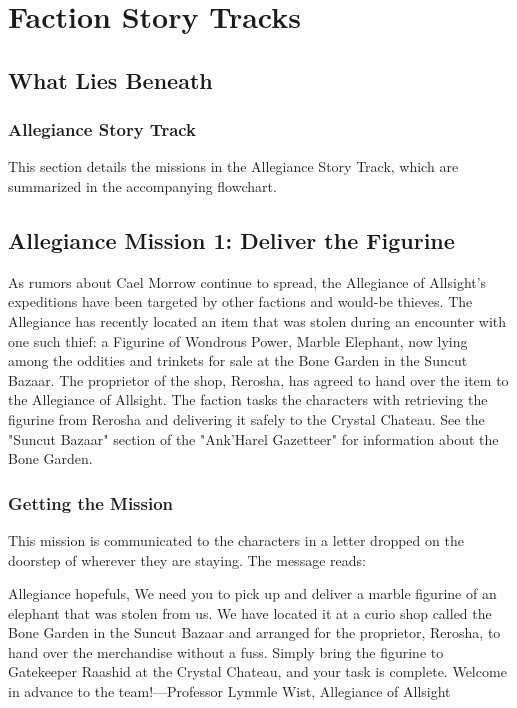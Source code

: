 \documentclass[10pt,a4,twoside,twocolumn,openany,nodeprecatedcode]{dndbook}
\begin{document}
\section{Faction Story Tracks}
\subsection{What Lies Beneath}
\subsubsection{Allegiance Story Track}
This section details the missions in the Allegiance Story Track, which are summarized in the accompanying flowchart.
\subsection{Allegiance Mission 1: Deliver the Figurine}
As rumors about Cael Morrow continue to spread, the Allegiance of Allsight's expeditions have been targeted by other factions and would-be thieves. The Allegiance has recently located an item that was stolen during an encounter with one such thief: a Figurine of Wondrous Power, Marble Elephant, now lying among the oddities and trinkets for sale at the Bone Garden in the Suncut Bazaar. The proprietor of the shop, Rerosha, has agreed to hand over the item to the Allegiance of Allsight. The faction tasks the characters with retrieving the figurine from Rerosha and delivering it safely to the Crystal Chateau. See the "Suncut Bazaar" section of the "Ank'Harel Gazetteer" for information about the Bone Garden.
\subsubsection{Getting the Mission}
This mission is communicated to the characters in a letter dropped on the doorstep of wherever they are staying. The message reads:
\begin{DndReadAloud}{}
Allegiance hopefuls,
We need you to pick up and deliver a marble figurine of an elephant that was stolen from us. We have located it at a curio shop called the Bone Garden in the Suncut Bazaar and arranged for the proprietor, Rerosha, to hand over the merchandise without a fuss. Simply bring the figurine to Gatekeeper Raashid at the Crystal Chateau, and your task is complete.
Welcome in advance to the team!—Professor Lymmle Wist, Allegiance of Allsight
\end{DndReadAloud}
\end{document}
